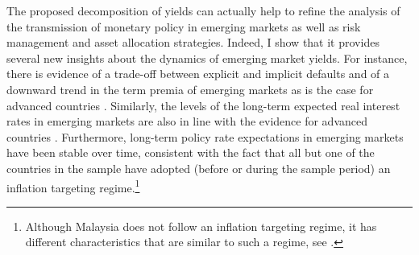 {The proposed decomposition of yields can actually help to refine the analysis of the transmission of monetary policy in emerging markets as well as risk management and asset allocation strategies. %
Indeed, I show that it provides several new insights about the dynamics of emerging market yields.
For instance, there is evidence of a trade-off between explicit and implicit defaults and of a downward trend in the term premia of emerging markets as is the case for advanced countries \citep{Wright:2011}. 
Similarly, the levels of the long-term expected real interest rates in emerging markets are also in line with the evidence for advanced countries \citep*{HolstonLaubachWilliams:2017}. 
Furthermore, long-term policy rate expectations in emerging markets have been stable over time, consistent with the fact that all but one of the countries in the sample have adopted (before or during the sample period) an inflation targeting regime.\footnote{ Although Malaysia does not follow an inflation targeting regime, it has different characteristics that are similar to such a regime, see \cite{PenningsRamayandiTang:2015}.}


}
